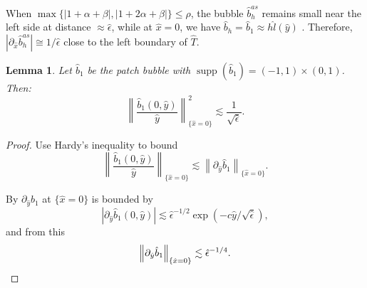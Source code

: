 \documentclass{article}
\newtheorem{lemma}[thm]{Lemma}
\DeclareMathOperator{\supp}{supp}
\newcommand{\oab}{\ensuremath{1+\alpha+\beta}}
\newcommand{\otab}{\ensuremath{1+2\alpha+\beta}}
\newcommand{\hatT}{\ensuremath{{\hat{T}}}}
\newcommand{\hatb}{\ensuremath{\hat{b}}}
\newcommand{\hatx}{\ensuremath{{\hat{x}}}}
\newcommand{\haty}{\ensuremath{{\hat{y}}}}
\begin{document}
\begin{appendix}
When $\max\{|\oab|,|\otab|\}\le \rho$, the bubble $\hatb_h^{as}$ remains small near the left side at distance $\approx \hat{\epsilon}$, 
while at $\hatx=0$, we have $\hatb_h = \hatb_1\approx h \hat l(\haty)$ .
Therefore, $|\partial_\hatx \hatb_h^{as}|\cong 1/\hat{\epsilon}$ close to the left boundary of $\hatT$.


\begin{lemma}
\label{Lemma:bubble_bound_sup}
Let $\hat{b}_1$ be the patch bubble with $\supp(\hat{b}_1)=(-1,1)\times(0,1)$. Then:
\begin{equation*}
 \left\| \frac{\hat{b}_1(0,\haty)}{\haty} \right\|_{\{\hat{x}=0\}}^2 \lesssim
   \frac{1}{\sqrt{\hat{\epsilon}}}.
\end{equation*}
\end{lemma}

\begin{proof}
Use Hardy's inequality to bound 
\begin{equation*}
 \left\| \frac{\hat{b}_1(0,\haty)}{\haty} \right\|_{\{\hat{x}=0\}} \lesssim
   \left\| \partial_{\hat{y}} \hat{b}_1 \right\|_{\{\hat{x}=0\}}.
\end{equation*}


By \cite[Theorem 5.1]{KelloggStynes:05} $\partial_{\hat{y}} \hat{b}_1$ at
$\{\hat{x}=0\}$ is bounded by
$$
|\partial_{\hat{y}} \hat{b}_1(0,\haty)| \lesssim \hat{\epsilon}^{-1/2} 
    \exp(-c \haty/\sqrt{\hat{\epsilon}}),
$$
and from this 
\[
 \left\| \partial_{\hat{y}} \hat{b}_1 \right\|_{\{\hat{x}=0\}} \lesssim \hat{\epsilon}^{-1/4}.
\qedhere
\]

\end{proof}
\end{appendix}
\end{document}
